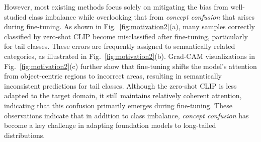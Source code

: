 


However, most existing methods focus solely on mitigating the bias from well-studied class imbalance while overlooking that from \textit{concept confusion} that arises during fine-tuning. As shown in Fig.~\ref{fig:motivation2}(a), many samples correctly classified by zero-shot CLIP become misclassified after fine-tuning, particularly for tail classes. These errors are frequently assigned to semantically related categories, as illustrated in Fig.~\ref{fig:motivation2}(b). Grad-CAM visualizations in Fig.~\ref{fig:motivation2}(c) further show that fine-tuning shifts the model’s attention from object-centric regions to incorrect areas, resulting in semantically inconsistent predictions for tail classes. Although the zero-shot CLIP is less adapted to the target domain, it still maintains relatively coherent attention, indicating that this confusion primarily emerges during fine-tuning. These observations indicate that in addition to class imbalance, \textit{concept confusion} has become a key challenge in adapting foundation models to long-tailed distributions. 




